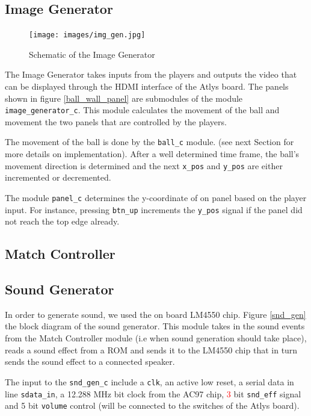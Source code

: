     \subsection{Image Generator}
	\begin{figure}[here]
		\centering
		\texttt{[image: images/img\_gen.jpg]}
		\caption{Schematic of the Image Generator}
		\label{img_gen}
	\end{figure}
        The Image Generator takes inputs from the players and outputs the video that can be displayed through the HDMI interface of the Atlys board. The panels shown in figure \ref{ball_wall_panel} are submodules of the module \texttt{image\_generator\_c}.
		This module calculates the movement of the ball and movement the two panels that are controlled by the players. 
		
		The movement of the ball is done by the \texttt{ball\_c} module. (see next Section for more details on implementation).
		After a well determined time frame, the ball's movement direction is determined and the next \texttt{x\_pos} and \texttt{y\_pos} are either incremented or decremented. 
		
		The module \texttt{panel\_c} determines the y-coordinate of on panel based on the player input. For instance, pressing \texttt{btn\_up} increments the \texttt{y\_pos} signal if the panel did not reach the top edge already. 


    \subsection{Match Controller}
    \subsection{Sound Generator}
       In order to generate sound, we used the on board LM4550 chip. Figure \ref{snd_gen} the block diagram of the sound generator. This module takes in the sound events from the Match Controller module (i.e when sound generation should take place), reads a sound effect from a ROM and sends it to the LM4550 chip that in turn sends the sound effect to a connected speaker.
				
				The input to the \texttt{snd\_gen\_c} include a \texttt{clk}, an active low reset, a serial data in line \texttt{sdata\_in}, a 12.288 MHz bit clock from the AC97 chip, \textcolor{red}{3} bit \texttt{snd\_eff} signal and 5 bit \texttt{volume} control (will be connected to the switches of the Atlys board).
				
